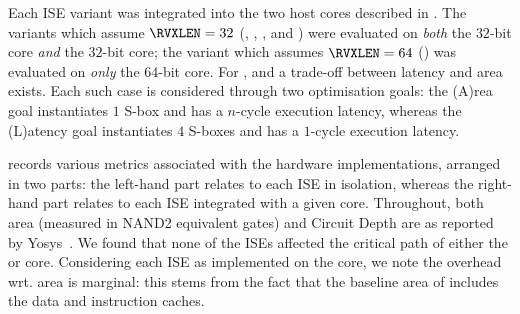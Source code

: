 
Each ISE variant was integrated into the two host cores 
described in .
The variants which assume  $\RVXLEN = 32$
(, , , and ) 
were evaluated
on {\em both} the
$32$-bit  core
{\em  and} the
$32$-bit  core;
the variant  which assumes $\RVXLEN = 64$
()
was  evaluated
on {\em only} the
$64$-bit  core.
For ,  and  a trade-off
between latency and area exists. 
Each such case is considered through two optimisation goals:
the (A)rea    goal
instantiates $1$ S-box   and has a $n$-cycle execution latency,
whereas
the (L)atency goal
instantiates $4$ S-boxes and has a $1$-cycle execution latency.

records
various metrics 
associated with the hardware implementations, 
arranged in two parts: 
the  left-hand part relates to each ISE in isolation,
whereas 
the right-hand part relates to each ISE integrated with a given core.
Throughout, both area (measured in NAND2 equivalent gates) and Circuit
Depth are as reported by Yosys~\cite{yosys}.  We found 
that none of the ISEs affected the critical path of either the  
or  core.
Considering each ISE as implemented on the  core, we note the 
overhead wrt. area is marginal: this stems from the fact that the 
baseline area of  includes the data and instruction caches.

